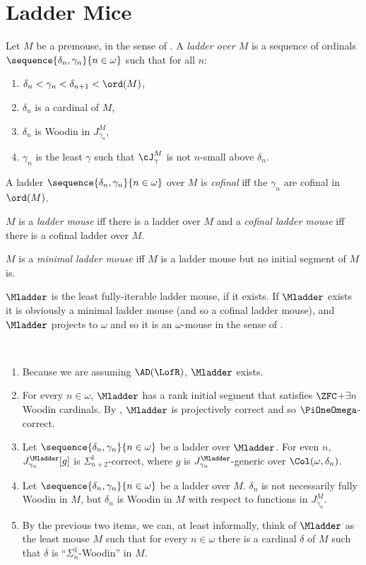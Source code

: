 \documentclass[oneside,12pt]{amsart}
\begin{document}
\section{Ladder Mice}
\label{section:laddermice}
\begin{definition}
Let $M$ be a premouse, in the sense of \cite{FSIT}. A \emph{ladder over $M$}
is a sequence of ordinals $\sequence{\delta_n,\gamma_n}{n\in\omega}$ such that
for all $n$:
\begin{enumerate}
\item $\delta_n < \gamma_n < \delta_{n+1} < \ord(M)$,
\item $\delta_n$ is a cardinal of $M$,
\item $\delta_n$ is Woodin in $J^M_{\gamma_n}$,
\item $\gamma_n$ is the least $\gamma$ such that $\cJ^M_{\gamma}$ is not $n$-small above $\delta_n$.
\end{enumerate}

A ladder $\sequence{\delta_n,\gamma_n}{n\in\omega}$ over $M$ is \emph{cofinal}
iff the $\gamma_n$ are cofinal in $\ord(M)$.

$M$ is a \emph{ladder mouse} iff there is a ladder over $M$ and a
\emph{cofinal ladder mouse} iff there is a cofinal ladder over $M$.

$M$ is a \emph{minimal ladder mouse} iff $M$ is a ladder mouse but no initial
segment of $M$ is.

$\Mladder$ is the least fully-iterable ladder mouse, if it exists. If
$\Mladder$ exists it is obviously a minimal ladder mouse (and so a cofinal
ladder mouse), and $\Mladder$ projects to $\omega$ and so it is an $\omega$-mouse
in the sense of \cite{Proj_WO_In_Mod}.
\end{definition}

\begin{remarks} \
\begin{enumerate}
\item Because we are assuming $\AD(\LofR)$, $\Mladder$ exists.
\item For every $n\in\omega$, $\Mladder$ has a rank initial segment that satisfies
$\ZFC$+$\exists n$ Woodin cardinals.  By \cite{Proj_WO_In_Mod}, $\Mladder$ is projectively correct and so $\PiOneOmega$-correct.
\item Let $\sequence{\delta_n,\gamma_n}{n\in\omega}$ be a ladder over $\Mladder$.
For even $n$, $J^{\Mladder}_{\gamma_n}[g]$ is $\Sigma^1_{n+2}$-correct,
where $g$ is $J^{\Mladder}_{\gamma_n}$-generic over $\Col(\omega,\delta_n)$.
\item Let $\sequence{\delta_n,\gamma_n}{n\in\omega}$ be a ladder over $M$.
$\delta_n$ is not necessarily fully Woodin in $M$, but $\delta_n$ is Woodin in $M$
with respect to functions in $J^M_{\gamma_n}$.
\item By the previous two items, we can, at least informally, think of
$\Mladder$ as the least mouse
$M$ such that for every $n\in\omega$ there is a cardinal $\delta$ of $M$ such
that $\delta$ is ``$\Sigma^1_n$-Woodin'' in $M$.
\end{enumerate}
\end{remarks}
\end{document}

